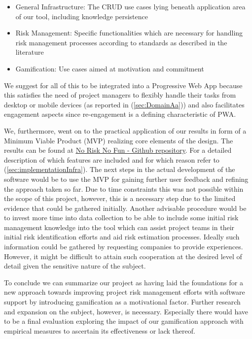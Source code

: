 \begin{itemize}
	\item General Infrastructure: The CRUD use cases lying beneath application area of our tool, including knowledge persistence 
	\item Risk Management: Specific functionalities which are necessary for handling risk management processes according to standards as described in the literature
	\item Gamification: Use cases aimed at motivation and commitment
\end{itemize}

We suggest for all of this to be integrated into a Progressive Web App because this satisfies the need of project managers to flexibly handle their tasks from desktop or mobile devices (as reported in (\ref{sec:DomainAa})) and also facilitates engagement aspects since re-engagement is a defining characteristic of PWA.

We, furthermore, went on to the practical application of our results in form of a Minimum Viable Product (MVP) realizing core elements of the design. The results can be found at
\underline{\href{https://github.com/Risk-Busters/NoRiskNoFun}{No Risk No Fun - Github repository}}. For a detailed description of which features are included and for which reason refer to (\ref{sec:implementationInfra}).
The next steps in the actual development of the software would be to use the MVP for gaining further user feedback and refining the approach taken so far. Due to time constraints this was not possible within the scope of this project, however, this is a necessary step due to the limited evidence that could be gathered initially.
Another advisable procedure would be to invest more time into data collection to be able to include some initial risk management knowledge into the tool which can assist project teams in their initial risk identification efforts and aid risk estimation processes. Ideally such information could be gathered by requesting companies to provide experiences. However, it might be difficult to attain such cooperation at the desired level of detail given the sensitive nature of the subject.

To conclude we can summarize our project as having laid the foundations for a new approach towards improving project risk management efforts with software support by introducing gamification as a motivational factor. Further research and expansion on the subject, however, is necessary. Especially there would have to be a final evaluation exploring the impact of our gamification approach with empirical measures to ascertain its effectiveness or lack thereof.




